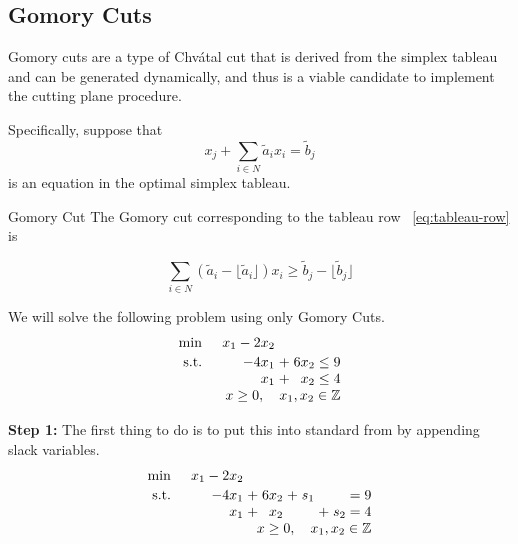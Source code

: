 \subsection{Gomory Cuts}
\label{subsec:gomory-cuts}
Gomory cuts are a type of Chv\'atal cut that is derived from the simplex tableau and can be generated dynamically, and thus is a viable candidate to implement the cutting plane procedure.

Specifically, suppose that 
\begin{equation}
\label{eq:tableau-row}
 x_j + \sum_{i\in N} \tilde a_i x_i = \tilde b_j
\end{equation}
is an equation in the optimal simplex tableau. 

\begin{general}{Gomory Cut}{}
The Gomory cut corresponding to the tableau row ~\eqref{eq:tableau-row} is

\begin{equation}
\label{eq:gomory-cut}
\sum_{i\in N} (\tilde a_i - \lfloor \tilde a_i \rfloor) x_i \geq \tilde b_j - \lfloor \tilde b_j\rfloor
\end{equation}

\end{general}

We will solve the following problem using only Gomory Cuts.
\[
\begin{array}{l r@{\;}c@{\;}r@{\;}c@{\;}r}
\min & x_1 - 2x_2 & & & & \\[2pt]
\st  & -4x_1 & + & 6x_2 & \leq & 9 \\
     & x_1   & + & x_2  & \leq & 4 \\
     & \multicolumn{5}{r}{x \geq 0, \quad x_1,x_2 \in \Z}
\end{array}
\]

\textbf{Step 1:} The first thing to do is to put this into standard from by appending slack variables.
\begin{equation}
\label{eq:gomory-standard-form}
\begin{array}{l r@{\;}c@{\;}r@{\;}c@{\;}r@{\;}c@{\;}r@{\;}c@{\;}r}
\min & x_1 - 2x_2 & & & & & & & & \\[2pt]
\st  & -4x_1 & + & 6x_2 & + & s_1 &   &     & = & 9 \\
     & x_1   & + & x_2  &   &     & + & s_2 & = & 4 \\
     & \multicolumn{9}{r}{x \geq 0, \quad x_1,x_2 \in \Z}
\end{array}
\end{equation}

